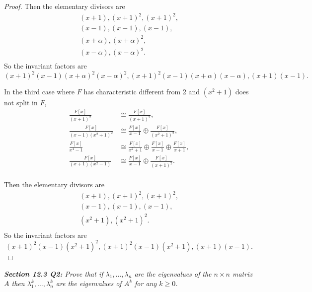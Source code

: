 \documentclass{article}
\begin{document}
\begin{proof}
    Then the elementary divisors are
    \begin{align*}
      (x+1), (x+1)^2, (x+1)^2,\\
      (x-1), (x-1), (x-1),\\
      (x+\alpha), (x+\alpha)^2,\\
      (x-\alpha), (x-\alpha)^2.\\
    \end{align*}
    So the invariant factors are
    \[(x+1)^2(x-1)(x+\alpha)^2(x-\alpha)^2,
    (x+1)^2(x-1)(x+\alpha)(x-\alpha), (x+1)(x-1).\]

    In the third case where $F$ has characteristic different
    from 2 and $(x^2+1)$ does not split in $F$,
    \begin{align*}
      \frac{F[x]}{(x+1)^2} &\cong \frac{F[x]}{(x+1)^2},\\
      \frac{F[x]}{(x-1)(x^2+1)^2} &\cong \frac{F[x]}{x-1} \oplus
        \frac{F[x]}{(x^2+1)^2},\\
      \frac{F[x]}{x^4-1} &\cong \frac{F[x]}{x^2+1} \oplus
        \frac{F[x]}{x-1} \oplus \frac{F[x]}{x+1},\\
      \frac{F[x]}{(x+1)(x^2-1)} &\cong \frac{F[x]}{x-1} \oplus
        \frac{F[x]}{(x+1)^2}.\\
    \end{align*}

    Then the elementary divisors are
    \begin{align*}
      (x+1), (x+1)^2, (x+1)^2,\\
      (x-1), (x-1), (x-1),\\
      (x^2+1), (x^2+1)^2.\\
    \end{align*}
    So the invariant factors are
    \[(x+1)^2(x-1)(x^2+1)^2, (x+1)^2(x-1)(x^2+1), (x+1)(x-1).\]
  \end{proof}

\it \textbf{Section 12.3 Q2:} Prove that if $\lambda_1,\ldots,\lambda_n$
  are the eigenvalues of the $n\times n$ matrix $A$ then
  $\lambda_1^k,\ldots,\lambda_n^k$ are the eigenvalues of $A^k$ for any
  $k\geq0$.
\end{document}
